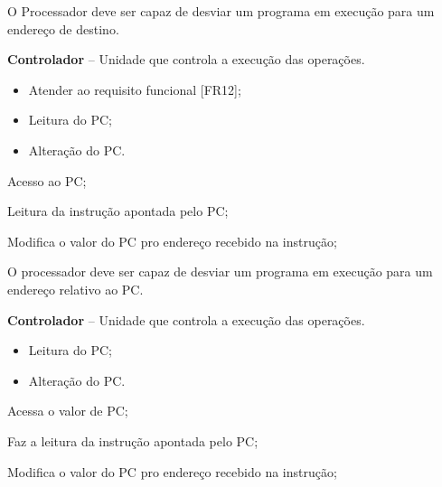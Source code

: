 \documentclass{article}
\begin{document}
  O Processador deve ser capaz de desviar um programa em execução para um endereço de destino.
  \actors
    \begin{description}
     \item \textbf{Controlador} – Unidade que controla a execução das operações.
    \end{description}
    
  \preconditions 
    \begin{itemize}
     \item Atender ao requisito funcional [FR12];
     \item Leitura do PC;
    \end{itemize}

  \postconditions
    \begin{itemize}
     \item Alteração do PC.
    \end{itemize}
  
  
  \begin{mainflow}
    \item Acesso ao PC;
    \item Leitura da instrução apontada pelo PC;
    \item Modifica o valor do PC pro endereço recebido na instrução;
  \end{mainflow}
  
  O processador deve ser capaz de desviar um programa em execução para um endereço relativo ao PC.
  \actors
  \begin{description}
  	\item \textbf{Controlador} – Unidade que controla a execução das operações.
  \end{description}
  
  \preconditions 
  \begin{itemize}
  	\item Leitura do PC;
  \end{itemize}
  
  \postconditions
  \begin{itemize}
  	\item Alteração do PC.
  \end{itemize}
  
  
  \begin{mainflow}
  	\item Acessa o valor de PC;
  	\item Faz a leitura da instrução apontada pelo PC;
  	\item Modifica o valor do PC pro endereço recebido na instrução;
  \end{mainflow}
  
\end{document}
